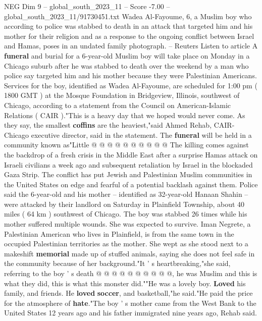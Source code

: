 \begin{textsample}{NEG Dim 9 – global\_south\_2023\_11 – Score -7.00 – global\_south\_2023\_11/91730451.txt}  \label{ex:f9_neg_311}
Wadea Al-Fayoume, 6, a Muslim boy who according to police was stabbed to death in an attack that targeted him and his mother for their religion and as a response to the ongoing conflict between Israel and Hamas, poses in an undated family photograph. -- Reuters Listen to article A \textbf{funeral} and burial for a 6-year-old Muslim boy will take place on Monday in a Chicago suburb after he was stabbed to death over the weekend by a man who police say targeted him and his mother because they were Palestinian Americans.
Services for the boy, identified as Wadea Al-Fayoume, are scheduled for 1:00 pm ( 1800 GMT ) at the Mosque Foundation in Bridgeview, Illinois, southwest of Chicago, according to a statement from the Council on American-Islamic Relations ( CAIR )."This is a heavy day that we hoped would never come.
As they say, the smallest \textbf{coffins} are the heaviest,"said Ahmed Rehab, CAIR-Chicago executive director, said in the statement.
The \textbf{funeral} will be held in a community known as"Little @ @ @ @ @ @ @ @ @ @ The killing comes against the backdrop of a fresh crisis in the Middle East after a surprise Hamas attack on Israeli civilians a week ago and subsequent retaliation by Israel in the blockaded Gaza Strip.
The conflict has put Jewish and Palestinian Muslim communities in the United States on edge and fearful of a potential backlash against them.
Police said the 6-year-old and his mother -- identified as 32-year-old Hanaan Shahin -- were attacked by their landlord on Saturday in Plainfield Township, about 40 miles ( 64 km ) southwest of Chicago.
The boy was stabbed 26 times while his mother suffered multiple wounds.
She was expected to survive.
Iman Negrete, a Palestinian American who lives in Plainfield, is from the same town in the occupied Palestinian territories as the mother.
She wept as she stood next to a makeshift \textbf{memorial} made up of stuffed animals, saying she does not feel safe in the community because of her background."It ' s heartbreaking,"she said, referring to the boy ' s death @ @ @ @ @ @ @ @ @ @, he was Muslim and this is what they did, this is what this monster did.""He was a lovely boy. \textbf{Loved} his family, and friends.
He \textbf{loved} \textbf{soccer}, and basketball,"he said."He paid the price for the atmosphere of \textbf{hate}."The boy ' s mother came from the West Bank to the United States 12 years ago and his father immigrated nine years ago, Rehab said.

\end{textsample}
